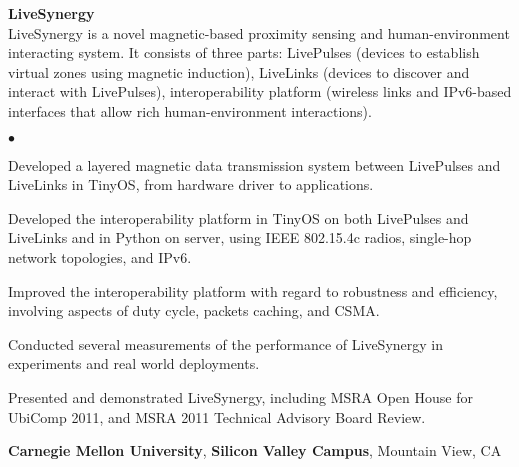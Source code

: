 \documentclass[margin,line]{res}
\newenvironment{list1}{
  \begin{list}{\ding{113}}{
      \setlength{\itemsep}{0in}
      \setlength{\parsep}{0in} \setlength{\parskip}{0in}
      \setlength{\topsep}{0in} \setlength{\partopsep}{0in}
      \setlength{\leftmargin}{0.17in}}}{\end{list}}
\newenvironment{list2}{
  \begin{list}{$\bullet$}{
      \setlength{\itemsep}{0in}
      \setlength{\parsep}{0in} \setlength{\parskip}{0in}
      \setlength{\topsep}{0in} \setlength{\partopsep}{0in}
      \setlength{\leftmargin}{0.2in}}}{\end{list}}
\begin{document}
\begin{resume}
      \vspace*{-.1in}
      \begin{list1}
        \item[] {\bf LiveSynergy}\\
        LiveSynergy is a novel magnetic-based proximity sensing and human-environment interacting system. It consists of three parts: LivePulses (devices to establish virtual zones using magnetic induction), LiveLinks (devices to discover and interact with LivePulses), interoperability platform (wireless links and IPv6-based interfaces that allow rich human-environment interactions).
        \vspace*{.05in}
        \begin{list2}
          \item Developed a layered magnetic data transmission system between LivePulses and LiveLinks in TinyOS, from hardware driver to applications.
          \item Developed the interoperability platform in TinyOS on both LivePulses and LiveLinks and in Python on server, using IEEE 802.15.4c radios, single-hop network topologies, and IPv6.
          \item Improved the interoperability platform with regard to robustness and efficiency, involving aspects of duty cycle, packets caching, and CSMA.
          \item Conducted several measurements of the performance of LiveSynergy in experiments and real world deployments.
          \item Presented and demonstrated LiveSynergy, including MSRA Open House for UbiComp 2011, and MSRA 2011 Technical Advisory Board Review.
        \end{list2}
      \end{list1}


      {\bf Carnegie Mellon University}, {\bf Silicon Valley Campus}, Mountain View, CA


\end{resume}
\end{document}
